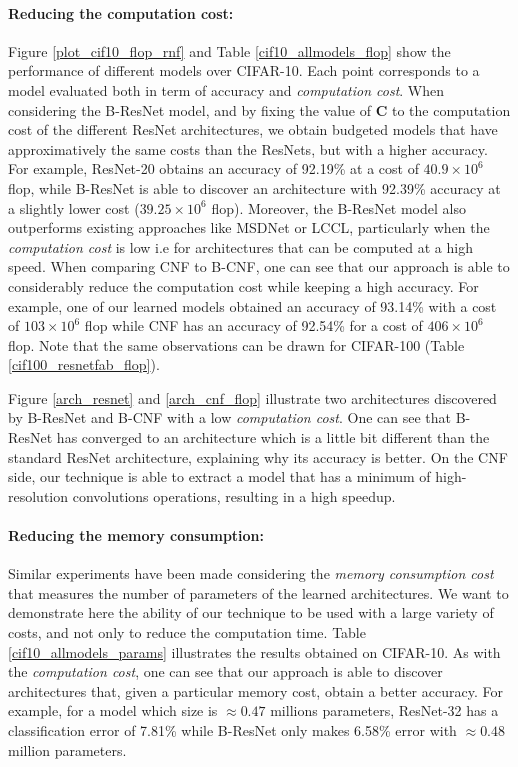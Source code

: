 \documentclass[10pt,twocolumn,letterpaper]{article}
\begin{document}


\paragraph{Reducing the computation cost:} Figure \ref{plot_cif10_flop_rnf} and Table \ref{cif10_allmodels_flop} show the performance of different models over CIFAR-10. Each point corresponds to a model evaluated both in term of accuracy and \textit{computation cost}. When considering the B-ResNet model, and by fixing the value of $\mathbf{C}$ to the computation cost of the different ResNet architectures, we obtain budgeted models that have approximatively the same costs than the ResNets, but with a higher accuracy. For example, ResNet-20 obtains an accuracy of 92.19\% at a cost of $40.9 \times 10^6$ flop, while B-ResNet is able to discover an architecture with 92.39\% accuracy at a slightly lower cost ($39.25 \times 10^6$ flop). Moreover, the B-ResNet model also outperforms existing approaches like MSDNet or LCCL, particularly when the \textit{computation cost} is low i.e for architectures that can be computed at a high speed. When comparing CNF to B-CNF, one can see that our approach is able to considerably reduce the computation cost while keeping a high accuracy. For example, one of our learned models obtained an accuracy of 93.14\% with a cost of $103 \times 10^6$ flop while CNF has an accuracy of 92.54\% for a cost of $406 \times 10^6$ flop. Note that the same observations can be drawn for CIFAR-100 (Table \ref{cif100_resnetfab_flop}). 

Figure \ref{arch_resnet} and \ref{arch_cnf_flop} illustrate two architectures discovered by B-ResNet and B-CNF with a low \textit{computation cost}. One can see that B-ResNet has converged to an architecture which is a little bit different than the standard ResNet architecture, explaining why its accuracy is better. On the CNF side, our technique is able to extract a model that has a minimum of high-resolution convolutions operations, resulting in a high speedup. 



\vspace{-0.3cm}
\paragraph{Reducing the memory consumption:} Similar experiments have been made considering the \textit{memory consumption cost} that measures the number of parameters of the learned architectures. We want to demonstrate here the ability of our technique to be used with a large variety of costs, and not only to reduce the computation time. Table \ref{cif10_allmodels_params} illustrates the results obtained on CIFAR-10. As with the \textit{computation cost}, one can see that our approach is able to discover architectures that, given a particular memory cost, obtain a better accuracy. For example, for a model which size is $\approx 0.47$ millions parameters, ResNet-32 has a classification error of 7.81\%  while B-ResNet only makes 6.58\% error with $\approx 0.48$ million parameters. 
\end{document}
